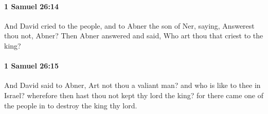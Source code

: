 		\paragraph{1 Samuel 26:14} %
			\label{1SAMUEL-26-14}

			And David cried to the people, and to Abner the son of Ner, saying, Answerest thou not, Abner? Then Abner answered and said, Who art thou that criest to the king?


		\paragraph{1 Samuel 26:15} %
			\label{1SAMUEL-26-15}

			And David said to Abner, Art not thou a valiant man? and who is like to thee in Israel? wherefore then hast thou not kept thy lord the king? for there came one of the people in to destroy the king thy lord.

